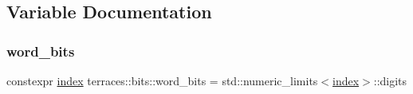 \subsection{Variable Documentation}
\mbox{\label{namespaceterraces_1_1bits_a28c9241b715c016e03707018a33b6350}} 
\subsubsection{\texorpdfstring{word\+\_\+bits}{word\_bits}}
{\footnotesize\ttfamily constexpr \hyperlink{namespaceterraces_adbc33ccb543d1634e96d0eb02e472c77}{index} terraces\+::bits\+::word\+\_\+bits = std\+::numeric\+\_\+limits$<$\hyperlink{namespaceterraces_adbc33ccb543d1634e96d0eb02e472c77}{index}$>$\+::digits}

